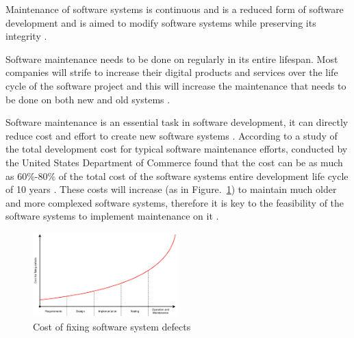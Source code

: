 Maintenance of software systems is continuous and is a reduced form of software development and is aimed to modify software systems while preserving its integrity \cite{Sneed2004, Ackermann2009}.\par Software maintenance needs to be done on regularly in its entire lifespan. Most companies will strife to increase their digital products and services over the life cycle of the software project and this will increase the maintenance that needs to be done on both new and old systems \cite{Niu2018, Galster2019, Hasan2012}. \par Software maintenance is an essential task in software development, it can directly reduce cost and effort to create new software systems \cite{FrancisThamburaj2017}. According to a study of the total development cost for typical software maintenance efforts, conducted by the United States Department of Commerce found that the cost can be as much as $60\%$-$80\%$ of the total cost of the software systems entire development life cycle of 10 years \cite{Ogheneovo2014, Stark1996, Ackermann2009}. These costs will increase (as in Figure.~\ref{fig:CH1_Costs_of_fixing_bugs}) to maintain much older and more complexed software systems, therefore it is key to the feasibility of the software systems to implement maintenance on it \cite{Alenezi2016, Booch1986}.

\begin{figure}[h!] %
    \centering %
    \includegraphics[width=0.5\textwidth]{Images/Chapter1/Background/Cost_of_fixing_bugs/Cost_of_fixing_bugs.pdf}
    \caption{Cost of fixing software system defects \cite{Ogheneovo2014}}\label{fig:CH1_Costs_of_fixing_bugs}
\end{figure} 

